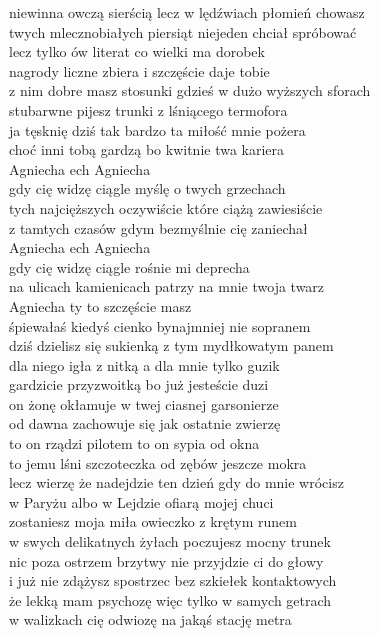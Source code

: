 \begin{text}
    niewinna owczą sierścią lecz w lędźwiach płomień chowasz\\
    twych mlecznobiałych piersiąt niejeden chciał spróbować\\
    lecz tylko ów literat co wielki ma dorobek\\
    nagrody liczne zbiera i szczęście daje tobie\\
    z nim dobre masz stosunki gdzieś w dużo wyższych sforach\\
    stubarwne pijesz trunki z lśniącego termofora\\
    ja tęsknię dziś tak bardzo ta miłość mnie pożera\\
    choć inni tobą gardzą bo kwitnie twa kariera\\
    Agniecha ech Agniecha\\
    gdy cię widzę ciągle myślę o twych grzechach\\
    tych najcięższych oczywiście które ciążą zawiesiście\\
    z tamtych czasów gdym bezmyślnie cię zaniechał\\
    Agniecha ech Agniecha\\
    gdy cię widzę ciągle rośnie mi deprecha\\
    na ulicach kamienicach patrzy na mnie twoja twarz\\
    Agniecha ty to szczęście masz\\
    śpiewałaś kiedyś cienko bynajmniej nie sopranem\\
    dziś dzielisz się sukienką z tym mydłkowatym panem\\
    dla niego igła z nitką a dla mnie tylko guzik\\
    gardzicie przyzwoitką bo już jesteście duzi\\
    on żonę okłamuje w twej ciasnej garsonierze\\
    od dawna zachowuje się jak ostatnie zwierzę\\
    to on rządzi pilotem to on sypia od okna\\
    to jemu lśni szczoteczka od zębów jeszcze mokra\\
    lecz wierzę że nadejdzie ten dzień gdy do mnie wrócisz\\
    w Paryżu albo w Lejdzie ofiarą mojej chuci\\
    zostaniesz moja miła owieczko z krętym runem\\
    w swych delikatnych żyłach poczujesz mocny trunek\\
    nic poza ostrzem brzytwy nie przyjdzie ci do głowy\\
    i już nie zdążysz spostrzec bez szkiełek kontaktowych\\
    że lekką mam psychozę więc tylko w samych getrach\\
    w walizkach cię odwiozę na jakąś stację metra
\end{text}
\begin{chord}

\end{chord}